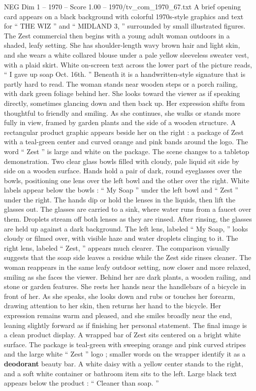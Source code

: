 \begin{textsample}{NEG Dim 1 – 1970 – Score 1.00 – 1970/tv\_com\_1970\_67.txt}  \label{ex:f1_neg_040}
A brief opening card appears on a black background with colorful 1970s-style graphics and text for “ THE WIZ ” and “ MIDLAND 3, ” surrounded by small illustrated figures.
The Zest commercial then begins with a young adult woman outdoors in a shaded, leafy setting.
She has shoulder-length wavy brown hair and light skin, and she wears a white collared blouse under a pale yellow sleeveless sweater vest, with a plaid skirt.
White on-screen text across the lower part of the picture reads, “ I gave up soap Oct. 16th. ” Beneath it is a handwritten-style signature that is partly hard to read.
The woman stands near wooden steps or a porch railing, with dark green foliage behind her.
She looks toward the viewer as if speaking directly, sometimes glancing down and then back up.
Her expression shifts from thoughtful to friendly and smiling.
As she continues, she walks or stands more fully in view, framed by garden plants and the side of a wooden structure.
A rectangular product graphic appears beside her on the right : a package of Zest with a teal-green center and curved orange and pink bands around the logo.
The word “ Zest ” is large and white on the package.
The scene changes to a tabletop demonstration.
Two clear glass bowls filled with cloudy, pale liquid sit side by side on a wooden surface.
Hands hold a pair of dark, round eyeglasses over the bowls, positioning one lens over the left bowl and the other over the right.
White labels appear below the bowls : “ My Soap ” under the left bowl and “ Zest ” under the right.
The hands dip or hold the lenses in the liquids, then lift the glasses out.
The glasses are carried to a sink, where water runs from a faucet over them.
Droplets stream off both lenses as they are rinsed.
After rinsing, the glasses are held up against a dark background.
The left lens, labeled “ My Soap, ” looks cloudy or filmed over, with visible haze and water droplets clinging to it.
The right lens, labeled “ Zest, ” appears much clearer.
The comparison visually suggests that the soap side leaves a residue while the Zest side rinses cleaner.
The woman reappears in the same leafy outdoor setting, now closer and more relaxed, smiling as she faces the viewer.
Behind her are dark plants, a wooden railing, and stone or garden features.
She rests her hands near the handlebars of a bicycle in front of her.
As she speaks, she looks down and rubs or touches her forearm, drawing attention to her skin, then returns her hand to the bicycle.
Her expression remains warm and pleased, and she smiles broadly near the end, leaning slightly forward as if finishing her personal statement.
The final image is a clean product display.
A wrapped bar of Zest sits centered on a bright white surface.
The package is teal-green with sweeping orange and pink curved stripes and the large white “ Zest ” logo ; smaller words on the wrapper identify it as a \textbf{deodorant} beauty bar.
A white daisy with a yellow center stands to the right, and a soft white container or bathroom item sits to the left.
Large black text appears below the product : “ Cleaner than soap. ”

\end{textsample}

